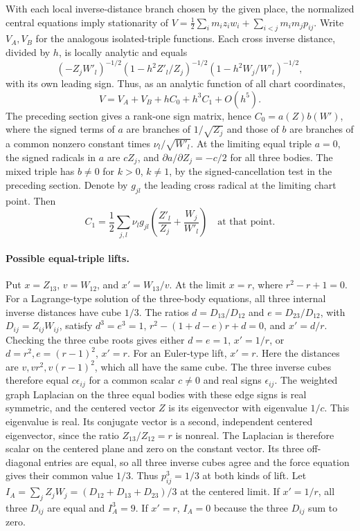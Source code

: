 \documentclass[11pt]{article}
\begin{document}
With each local inverse-distance branch chosen by the given place, the
normalized central equations imply stationarity of
\(V=\frac12\sum_i m_i z_iw_i+\sum_{i<j}m_im_jp_{ij}\).
Write \(V_A,V_B\) for the analogous isolated-triple functions. Each cross
inverse distance, divided by \(h\), is locally analytic and equals
\[
 (-Z_jW'_l)^{-1/2}
 (1-h^2Z'_l/Z_j)^{-1/2}(1-h^2W_j/W'_l)^{-1/2},
\]
with its own leading sign. Thus, as an analytic function of all chart
coordinates,
\[
 V=V_A+V_B+h C_0+h^3 C_1+O(h^5).
\]
The preceding section gives a rank-one sign matrix, hence
\(C_0=a(Z)b(W')\), where the signed terms of \(a\) are branches of
\(1/\sqrt{Z_j}\) and those of \(b\) are branches of a common nonzero
constant times \(\nu_l/\sqrt{W'_l}\). At the limiting equal triple
\(a=0\), the signed radicals in \(a\) are \(c Z_j\), and
\(\partial a/\partial Z_j=-c/2\) for all three bodies. The mixed
triple has \(b\ne0\) for \(k>0\), \(k\ne1\), by the signed-cancellation
test in the preceding section. Denote by \(g_{jl}\) the leading cross
radical at the limiting chart point. Then
\[
 C_1=\frac12\sum_{j,l}\nu_l g_{jl}
    \left(\frac{Z'_l}{Z_j}+\frac{W_j}{W'_l}\right)
 \quad\text{at that point}.
\]

\paragraph{Possible equal-triple lifts.}
Put \(x=Z_{13}\), \(v=W_{12}\), and \(x'=W_{13}/v\).
At the limit \(x=r\), where \(r^2-r+1=0\).
For a Lagrange-type solution of the three-body equations,
all three internal inverse distances have cube \(1/3\).
The ratios \(d=D_{13}/D_{12}\) and \(e=D_{23}/D_{12}\), with
\(D_{ij}=Z_{ij}W_{ij}\), satisfy \(d^3=e^3=1\),
\(r^2-(1+d-e)r+d=0\), and \(x'=d/r\).
Checking the three cube roots gives either \(d=e=1\),
\(x'=1/r\), or \(d=r^2,e=(r-1)^2\), \(x'=r\).
For an Euler-type lift, \(x'=r\). Here the distances are
\(v,vr^2,v(r-1)^2\), which all have the same cube. The three inverse
cubes therefore equal \(c\epsilon_{ij}\) for a common scalar \(c\ne0\)
and real signs \(\epsilon_{ij}\). The weighted graph Laplacian on the
three equal bodies with these edge signs is real symmetric, and the
centered vector \(Z\) is its eigenvector with eigenvalue \(1/c\).
This eigenvalue is real. Its conjugate vector is a second, independent
centered eigenvector, since the ratio \(Z_{13}/Z_{12}=r\) is nonreal.
The Laplacian is therefore scalar on the centered plane and zero on
the constant vector. Its three off-diagonal entries are equal, so all
three inverse cubes agree and the force equation gives their common
value \(1/3\).
Thus \(p_{ij}^3=1/3\) at both kinds of lift. Let
\(I_A=\sum_j Z_j W_j=(D_{12}+D_{13}+D_{23})/3\) at the centered
limit. If \(x'=1/r\), all three \(D_{ij}\) are equal and \(I_A^3=9\).
If \(x'=r\), \(I_A=0\) because the three \(D_{ij}\) sum to zero.
\end{document}
